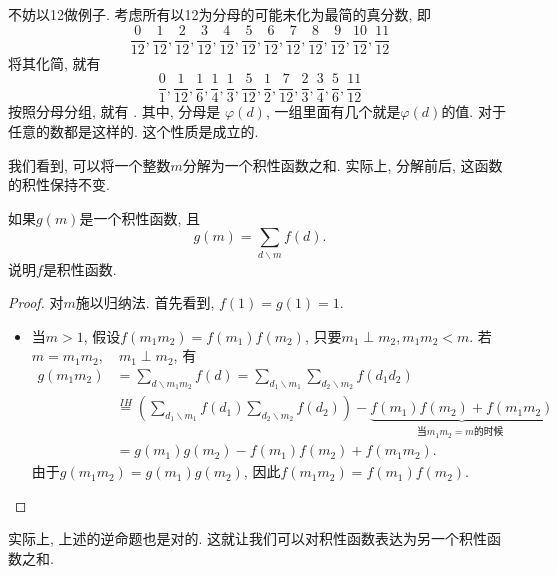 \documentclass{ctexart}
\newcommand{\zc}{\backslash}
\begin{document}
不妨以12做例子. 考虑所有以12为分母的可能未化为最简的真分数, 即
$$
\frac{0}{12}, \frac{1}{12}, \frac{2}{12}, \frac{3}{12}, \frac{4}{12}, \frac{5}{12}, \frac{6}{12}, \frac{7}{12}, \frac{8}{12}, \frac{9}{12}, \frac{10}{12}, \frac{11}{12}
$$
将其化简, 就有
$$
\frac{0}{1}, \frac{1}{12}, \frac{1}{6}, \frac{1}{4}, \frac{1}{3}, \frac{5}{12}, \frac{1}{2}, \frac{7}{12}, \frac{2}{3}, \frac{3}{4}, \frac{5}{6}, \frac{11}{12}
$$
按照分母分组, 就有
. 其中, 分母是
$\varphi(d)$, 一组里面有几个就是$\varphi(d)$的值. 对于任意的数都是这样的. 这个性质是成立的. 

我们看到, 可以将一个整数$m$分解为一个积性函数之和. 实际上, 分解前后, 这函数的积性保持不变. 

\begin{prop}如果$g(m)$是一个积性函数, 且
    $$
g(m)=\sum_{d \backslash m} f(d) .
$$
说明$f$是积性函数. 
\end{prop}

\begin{proof}
    对$m$施以归纳法. 首先看到, $f(1)=g(1)=1.$ 
    \begin{itemize}
        \item 当$m>1$, 假设$f\left(m_1 m_2\right)=f\left(m_1\right) f\left(m_2\right)$, 只要$m_1 \perp m_2, m_1 m_2<m$. 若$m=m_1 m_2, \quad m_1 \perp m_2$, 有
            $$
\begin{aligned}
g\left(m_1 m_2\right) & =\sum_{d \zc m_1 m_2} f(d)=\sum_{d_1 \zc m_1} \sum_{d_2 \zc m_2} f\left(d_1 d_2\right) \\
                      & \stackrel{IH}{=}\left(\sum_{d_1 \zc m_1} f\left(d_1\right) \sum_{d_2 \zc m_2} f\left(d_2\right)\right) -\underbrace{f\left(m_1\right) f\left(m_2\right)+f\left(m_1 m_2\right)}_{\text{当} m_1 m_2=m {\text {的时候 }}} \\
& =g\left(m_1\right) g\left(m_2\right)-f\left(m_1\right) f\left(m_2\right)+f\left(m_1 m_2\right) .
\end{aligned}
$$
由于$g\left(m_1 m_2\right)=g\left(m_1\right) g\left(m_2\right)$, 因此$f\left(m_1 m_2\right)=f\left(m_1\right) f\left(m_2\right)$. 

    \end{itemize}
\end{proof}

实际上, 上述的逆命题也是对的. 这就让我们可以对积性函数表达为另一个积性函数之和. 
\end{document}
